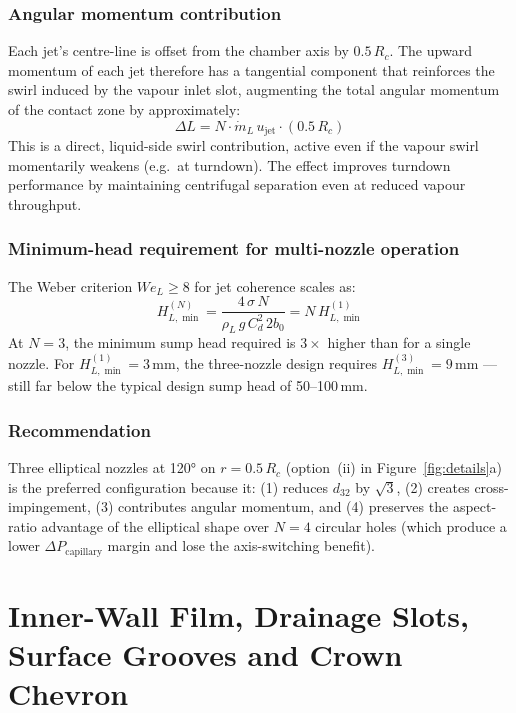 \documentclass[11pt,letterpaper]{article}
\newcommand{\rhoL}{\rho_L}
\newcommand{\We}{\mathit{We}}
\begin{document}
\subsubsection{Angular momentum contribution}

Each jet's centre-line is offset from the chamber axis by $0.5\,R_c$.
The upward momentum of each jet therefore has a tangential component
that reinforces the swirl induced by the vapour inlet slot, augmenting
the total angular momentum of the contact zone by approximately:
\[
  \Delta L = N \cdot \dot{m}_L\,u_{\mathrm{jet}}\cdot(0.5\,R_c)
\]
This is a direct, liquid-side swirl contribution, active even if the
vapour swirl momentarily weakens (e.g.\ at turndown).  The effect
improves turndown performance by maintaining centrifugal separation
even at reduced vapour throughput.

\subsubsection{Minimum-head requirement for multi-nozzle operation}

The Weber criterion $\We_L \ge 8$ for jet coherence scales as:
\[
  H_{L,\min}^{(N)} = \frac{4\,\sigma\,N}{\rhoL\,g\,C_d^2\,2b_0}
  = N\,H_{L,\min}^{(1)}
\]
At $N = 3$, the minimum sump head required is $3\times$ higher than
for a single nozzle.  For $H_{L,\min}^{(1)} = 3$\,mm, the
three-nozzle design requires $H_{L,\min}^{(3)} = 9$\,mm — still
far below the typical design sump head of 50--100\,mm.

\subsubsection{Recommendation}

Three elliptical nozzles at 120° on $r = 0.5\,R_c$ (option~(ii) in
Figure~\ref{fig:details}a) is the preferred configuration because it:
(1) reduces $d_{32}$ by $\sqrt{3}$, (2) creates cross-impingement,
(3) contributes angular momentum, and (4) preserves the aspect-ratio
advantage of the elliptical shape over $N = 4$ circular holes (which
produce a lower $\Delta P_{\mathrm{capillary}}$ margin and lose the
axis-switching benefit).

\section{Inner-Wall Film, Drainage Slots, Surface Grooves and Crown Chevron}
\label{sec:wall_film}
\end{document}
